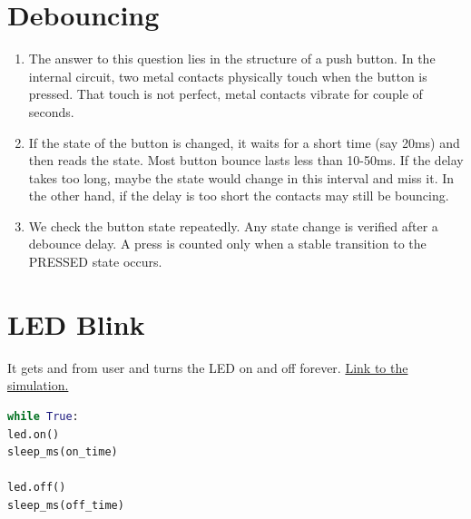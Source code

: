 \documentclass[12pt]{article}
\begin{document}
	\section{Debouncing}
	\begin{enumerate}[label = \alph*)]
		\item 
		The answer to this question lies in the structure of a push button. In the internal circuit, two metal contacts physically touch when the button is pressed.	That touch is not perfect, metal contacts vibrate for couple of seconds. 
		\item 
		If the state of the button is changed, it waits for a short time (say 20ms) and then reads the state. Most button bounce lasts less than 10-50ms. If the delay takes too long, maybe the state would change in this interval and miss it. In the other hand, if the delay is too short the contacts may still be bouncing.
		\item 
		We check the button state repeatedly. Any state change is verified after a debounce delay. A press is counted only when a stable transition to the PRESSED state occurs.
	\end{enumerate}
	
	\section{LED Blink}
	It gets  and  from user and turns the LED on and off forever. \href{https://wokwi.com/projects/467376754595875841}{Link to the simulation.}
	
	\begin{lstlisting}[language=Python]
while True:
led.on()
sleep_ms(on_time)

led.off()
sleep_ms(off_time)
	\end{lstlisting}
\end{document}
